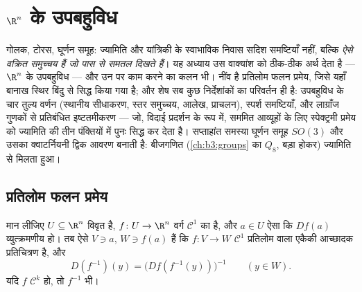 \chapter{\texorpdfstring{$\R^n$}{Rn} के उपबहुविध}
\label{ch:b3:submanifolds}

गोलक, टोरस, घूर्णन समूह: ज्यामिति और यांत्रिकी के स्वाभाविक निवास
सदिश समष्टियाँ नहीं, बल्कि \emph{ऐसे वक्रित समुच्चय हैं जो पास से
समतल दिखते हैं}। यह अध्याय उस वाक्यांश को ठीक-ठीक अर्थ देता है ---
$\R^n$ के उपबहुविध --- और उन पर काम करने का कलन भी। नींव है प्रतिलोम
फलन प्रमेय, जिसे यहाँ बानाख स्थिर बिंदु से सिद्ध किया गया है; और
शेष सब कुछ निर्देशांकों का परिवर्तन ही है: उपबहुविध के चार तुल्य
वर्णन (स्थानीय सीधाकरण, स्तर समुच्चय, आलेख, प्राचलन), स्पर्श
समष्टियाँ, और लाग्राँज गुणकों से प्रतिबंधित इष्टतमीकरण --- जो,
विदाई प्रदर्शन के रूप में, सममित आव्यूहों के लिए स्पेक्ट्रमी
प्रमेय को ज्यामिति की तीन पंक्तियों में पुनः सिद्ध कर देता है।
सप्ताहांत समस्या घूर्णन समूह $SO(3)$ और उसका क्वाटर्नियनी द्विक आवरण
बनाती है: बीजगणित (\cref{ch:b3:groups} का $Q_8$, बड़ा होकर) ज्यामिति से मिलता हुआ।

\section{प्रतिलोम फलन प्रमेय}

\begin{theorem}[प्रतिलोम फलन प्रमेय]
\label{thm:b3:submanifolds:ift}
मान लीजिए $U \subseteq \R^n$ विवृत है, $f \colon U \to \R^n$ वर्ग $\mathcal C^1$ का है, और $a \in U$ ऐसा कि
$Df(a)$ व्युत्क्रमणीय हो। तब ऐसे  $V \ni a$, $W \ni f(a)$ हैं कि
$f \colon V \to W$ $\mathcal C^1$ प्रतिलोम वाला एकैकी आच्छादक प्रतिचित्रण है,
और
\[
D(f^{-1})(y) = \bigl(Df(f^{-1}(y))\bigr)^{-1}
\qquad (y \in W).
\]
यदि $f$ $\mathcal C^k$ हो, तो $f^{-1}$ भी।
\end{theorem}

